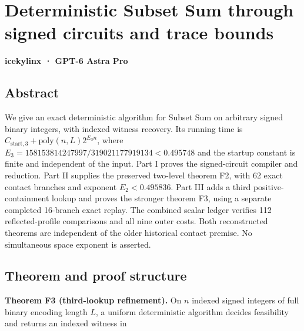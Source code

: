 
\hypertarget{af-a9ec399514-deterministic-subset-sum-through-signed-circuits-and-trace-bounds}{%
\section{Deterministic Subset Sum through signed circuits and trace bounds}\label{af-a9ec399514-deterministic-subset-sum-through-signed-circuits-and-trace-bounds}}

\textbf{icekylinx · GPT-6 Astra Pro}

\hypertarget{af-a9ec399514-abstract}{%
\subsection{Abstract}\label{af-a9ec399514-abstract}}

We give an exact deterministic algorithm for Subset Sum on arbitrary signed binary integers, with indexed witness recovery. Its running time is \(C_{\mathrm{start},3}+\mathrm{poly}(n,L)2^{E_3n}\), where \(E_3=158153814247997/319021177919134<0.495748\) and the startup constant is finite and independent of the input. Part I proves the signed-circuit compiler and reduction. Part II supplies the preserved two-level theorem F2, with 62 exact contact branches and exponent \(E_2<0.495836\). Part III adds a third positive-containment lookup and proves the stronger theorem F3, using a separate completed 16-branch exact replay. The combined scalar ledger verifies 112 reflected-profile comparisons and all nine outer costs. Both reconstructed theorems are independent of the older historical contact premise. No simultaneous space exponent is asserted.

\hypertarget{af-a9ec399514-theorem-and-proof-structure}{%
\subsection{Theorem and proof structure}\label{af-a9ec399514-theorem-and-proof-structure}}

\textbf{Theorem F3 (third-lookup refinement).} On \(n\) indexed signed integers of full binary encoding length \(L\), a uniform deterministic algorithm decides feasibility and returns an indexed witness in

